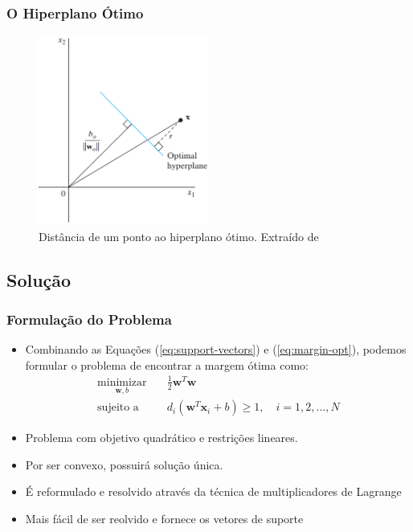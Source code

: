 \documentclass{beamer}
\begin{document}
\begin{frame}
	\frametitle{O Hiperplano Ótimo}

		\begin{figure}[h!]
			\centering
			\includegraphics[width=0.5\textwidth]{fig04.png}
			\caption{Distância de um ponto ao hiperplano ótimo. Extraído de \cite{haykin}}
			\label{fig:haykin-03}
		\end{figure}

\end{frame}


\subsection{Solução}

\begin{frame}
	\frametitle{Formulação do Problema}
	\begin{itemize}
		\item Combinando as Equações (\ref{eq:support-vectors}) e (\ref{eq:margin-opt}), podemos formular o problema de encontrar a margem ótima como:
		\begin{align}
			\underset{\textbf{w},b}{\text{minimizar}} \quad & \frac{1}{2}\textbf{w}^T\textbf{w} \\ 
			\text{sujeito a} \quad & d_i(\textbf{w}^T\textbf{x}_i + b) \geq 1, \quad i=1,2,\dots,N  \nonumber
			\label{eq:opt-prob1}
		\end{align} 
		\item Problema com objetivo quadrático e restrições lineares. 
		\item Por ser convexo, possuirá solução única.
		\item É reformulado e resolvido através da técnica de multiplicadores de Lagrange \cite{haykin}
		\item Mais fácil de ser reolvido e fornece os vetores de suporte
		
	\end{itemize}
	
\end{frame}
\end{document}
